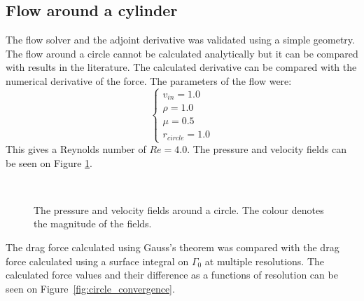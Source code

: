 \documentclass[12pt, a4paper]{article}
\begin{document}
\subsection{Flow around a cylinder}
The flow solver and the adjoint derivative was validated using a simple geometry. The flow around a circle cannot be calculated analytically but it can be compared with results in the literature. The calculated derivative can be compared with the numerical derivative of the force. The parameters of the flow were:
\begin{equation}
\begin{cases}
v_{in} = 1.0 \\
\rho = 1.0 \\
\mu = 0.5 \\
r_{circle} = 1.0
\end{cases}
\end{equation}
This gives a Reynolds number of $Re = 4.0$.
%
The pressure and velocity fields can be seen on Figure \ref{fig_circle}.
\begin{figure}[htbp]
    \centering
     \\
    \caption{The pressure and velocity fields around a circle. The colour denotes the magnitude of the fields.}
    \label{fig_circle}
\end{figure}
%
The drag force calculated using Gauss's theorem was compared with the drag force calculated using a surface integral on $\Gamma_0$ at multiple resolutions. The calculated force values and their difference as a functions of resolution can be seen on Figure~\ref{fig:circle_convergence}.
\end{document}
